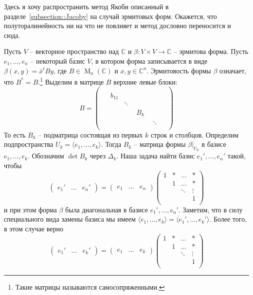 Здесь я хочу распространить метод Якоби описанный в разделе~\ref{subsection::Jacoby} на случай эрмитовых форм. Окажется, что полуторалинейность ни на что не повлияет и метод дословно переносится и сюда.

Пусть $V$ -- векторное пространство над $\mathbb C$ и $\beta\colon V\times V\to \mathbb C$ -- эрмитова форма. Пусть $e_1,\ldots,e_n$ -- некоторый базис $V$, в котором форма записывается в виде $\beta(x, y) = \bar x^t B y$, где $B\in \operatorname{M}_{n}(\mathbb C)$ и $x,y\in \mathbb C^n$. Эрмитовость формы $\beta$ означает, что $B^* = B$.\footnote{Такие матрицы называются самосопряженными.} Выделим в матрице $B$ верхние левые блоки:
\[
B =
\begin{pmatrix}
{\boxed{
\begin{matrix}
{
\boxed{
\begin{matrix}
{
\boxed{
\begin{matrix}
{\boxed{b_{11}}}&{}\\
{}&{\ddots}
\end{matrix}
}
}&{}\\
{}&{B_k}
\end{matrix}
}
}&{}\\
{}&{\ddots}
\end{matrix}
}
}&{}\\
{}&{}
\end{pmatrix}
\]
То есть $B_k$ -- подматрица состоящая из первых $k$ строк и столбцов. Определим подпространства $U_k = \langle e_1,\ldots,e_k\rangle$. Тогда $B_k$ -- матрица формы $\beta|_{U_k}$ в базисе $e_1,\ldots,e_k$. Обозначим $\det B_k$ через $\Delta_k$. Наша задача найти базис $e_1',\ldots,e_n'$ такой, чтобы
\[
\begin{pmatrix}
{e_1'}&{\ldots}&{e_n'}
\end{pmatrix}
=
\begin{pmatrix}
{e_1}&{\ldots}&{e_n}
\end{pmatrix}
\begin{pmatrix}
{1}&{*}&{\ldots}&{*}\\
{}&{1}&{\ldots}&{*}\\
{}&{}&{\ddots}&{\vdots}\\
{}&{}&{}&{1}\\
\end{pmatrix}
\]
и при этом форма $\beta$ была диагональная в базисе $e_1',\ldots,e_n'$. Заметим, что в силу специального вида замены базиса мы имеем $\langle e_1,\ldots,e_k \rangle = \langle e_1', \ldots,e_k'\rangle$. Более того, в этом случае верно
\[
\begin{pmatrix}
{e_1'}&{\ldots}&{e_k'}
\end{pmatrix}
=
\begin{pmatrix}
{e_1}&{\ldots}&{e_k}
\end{pmatrix}
\begin{pmatrix}
{1}&{*}&{\ldots}&{*}\\
{}&{1}&{\ldots}&{*}\\
{}&{}&{\ddots}&{\vdots}\\
{}&{}&{}&{1}\\
\end{pmatrix}
\]
